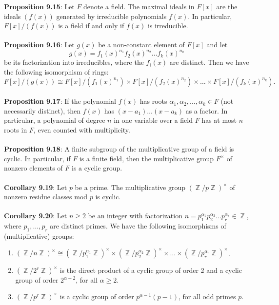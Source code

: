 \documentclass{article}
\DeclareMathOperator{\Z}{\mathbb{Z}}
\begin{document}
\textbf{Proposition 9.15}: Let $F$ denote a field. The maximal ideals in $F[x]$ are the ideals $(f(x))$ generated by irreducible polynomials $f(x)$. In particular, $F[x]/(f(x))$ is a field if and only if $f(x)$ is irreducible. \\ \\
\textbf{Proposition 9.16}: Let $g(x)$ be a non-constant element of $F[x]$ and let $$g(x) = f_1(x)^{n_1} f_2(x)^{n_2} \dots f_k(x)^{n_k}$$ be its factorization into irreducibles, where the $f_i(x)$ are distinct. Then we have the following isomorphism of rings: $$F[x]/(g(x)) \cong F[x]/(f_1(x)^{n_1}) \times F[x]/(f_2(x)^{n_2}) \times \dots \times F[x]/(f_k(x)^{n_k}).$$ \\
\textbf{Proposition 9.17}: If the polynomial $f(x)$ has roots $\alpha_1, \alpha_2, \dots, \alpha_k \in F$ (not necessarily distinct), then $f(x)$ has $(x - a_1) \dots (x - a_k)$ as a factor. In particular, a polynomial of degree $n$ in one variable over a field $F$ has at most $n$ roots in $F$, even counted with multiplicity. \\ \\
\textbf{Proposition 9.18}: A finite subgroup of the multiplicative group of a field is cyclic. In particular, if $F$ is a finite field, then the multiplicative group $F^\times$ of nonzero elements of $F$ is a cyclic group. \\ \\
\textbf{Corollary 9.19}: Let $p$ be a prime. The multiplicative group $(\Z/p\Z)^\times$ of nonzero residue
classes mod $p$ is cyclic. \\ \\
\textbf{Corollary 9.20}: Let $n \geq 2$ be an integer with factorization $n = p_1^{\alpha_1}p_2^{\alpha_2}\dots  p_r^{\alpha_r} \in \Z$, where $p_1, \dots, p_r$ are distinct primes. We have the following isomorphisms of (multiplicative) groups: \begin{enumerate}
    \item $(\Z/n\Z)^\times \cong (\Z/p_1^{\alpha_1}\Z)^\times \times (\Z/p_2^{\alpha_2}\Z)^\times \times \dots \times (\Z/p_r^{\alpha_r}\Z)^\times$.
    \item $(\Z/2^r\Z)^\times$ is the direct product of a cyclic group of order 2 and a cyclic group of order $2^{\alpha - 2}$, for all $\alpha \geq 2.$
    \item $(\Z/p^r\Z)^\times$ is a cyclic group of order $p^{\alpha - 1}(p - 1)$, for all odd primes $p$.
\end{enumerate} $ $
\end{document}
